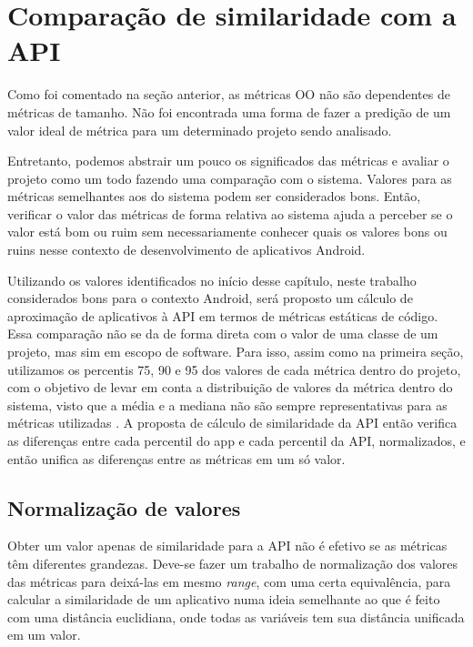 \section{Comparação de similaridade com a API}

Como foi comentado na seção anterior, as métricas OO não são dependentes de métricas de tamanho. Não foi encontrada uma forma de fazer a predição de um valor ideal de métrica para um determinado projeto sendo analisado.  

Entretanto, podemos abstrair um pouco os significados das métricas e avaliar o projeto como um todo fazendo uma comparação com o sistema. Valores para as métricas semelhantes aos do sistema podem ser considerados bons. Então, verificar o valor das métricas de forma relativa ao sistema ajuda a perceber se o valor está bom ou ruim sem necessariamente conhecer quais os valores bons ou ruins nesse contexto de desenvolvimento de aplicativos Android. 

Utilizando os valores identificados no início desse capítulo, neste trabalho considerados bons para o contexto Android, será proposto um cálculo de aproximação de aplicativos à API em termos de métricas estáticas de código. Essa comparação não se da de forma direta com o valor de uma classe de um projeto, mas sim em escopo de software. Para isso, assim como na primeira seção, utilizamos os percentis 75, 90 e 95 dos valores de cada métrica dentro do projeto, com o objetivo de levar em conta a distribuição de valores da métrica dentro do sistema, visto que a média e a mediana não são sempre representativas para as métricas utilizadas \cite{meirelles2013}. A proposta de cálculo de similaridade da API então verifica as diferenças entre cada percentil do app e cada percentil da API, normalizados, e então unifica as diferenças entre as métricas em um só valor. 

\subsection{Normalização de valores}

Obter um valor apenas de similaridade para a API não é efetivo se as métricas têm diferentes grandezas. Deve-se fazer um trabalho de normalização dos valores das métricas para deixá-las em mesmo \textit{range}, com uma certa equivalência, para calcular a similaridade de um aplicativo numa ideia semelhante ao que é feito com uma distância euclidiana, onde todas as variáveis tem sua distância unificada em um valor.

